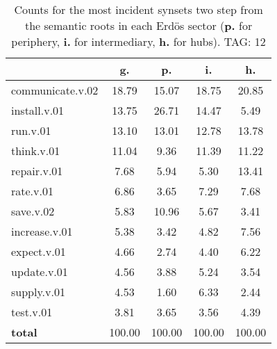 \begin{table}[h!]
\begin{center}
\begin{tabular}{| l || c | c | c | c |}\hline
 & {\bf g.} & {\bf p.} & {\bf i.} & {\bf h.} \\\hline\hline
communicate.v.02 & 18.79  & 15.07  & 18.75  & 20.85 \\\hline
install.v.01 & 13.75  & 26.71  & 14.47  & 5.49 \\\hline
run.v.01 & 13.10  & 13.01  & 12.78  & 13.78 \\\hline
think.v.01 & 11.04  & 9.36  & 11.39  & 11.22 \\\hline
repair.v.01 & 7.68  & 5.94  & 5.30  & 13.41 \\\hline
rate.v.01 & 6.86  & 3.65  & 7.29  & 7.68 \\\hline
save.v.02 & 5.83  & 10.96  & 5.67  & 3.41 \\\hline
increase.v.01 & 5.38  & 3.42  & 4.82  & 7.56 \\\hline
expect.v.01 & 4.66  & 2.74  & 4.40  & 6.22 \\\hline
update.v.01 & 4.56  & 3.88  & 5.24  & 3.54 \\\hline
supply.v.01 & 4.53  & 1.60  & 6.33  & 2.44 \\\hline
test.v.01 & 3.81  & 3.65  & 3.56  & 4.39 \\\hline\hline
{{\bf total}} & 100.00  & 100.00  & 100.00  & 100.00 \\\hline
\end{tabular}
\caption{Counts for the most incident synsets two step from the semantic roots in each Erd\"os sector ({\bf p.} for periphery, {\bf i.} for intermediary, {\bf h.} for hubs). TAG: 12}
\end{center}
\end{table}